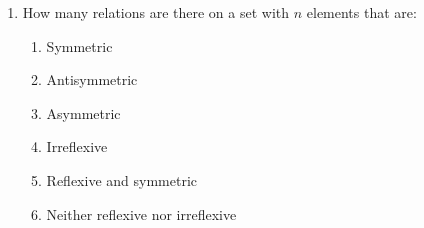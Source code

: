 \documentclass[a4paper]{article}
\begin{document}
\begin{enumerate}
\item How many relations are there on a set with $n$ elements that are:
\begin{enumerate}
\item Symmetric
\item Antisymmetric
\item Asymmetric
\item Irreflexive
\item Reflexive and symmetric
\item Neither reflexive nor irreflexive
\end{enumerate}


\end{enumerate}
\end{document}
